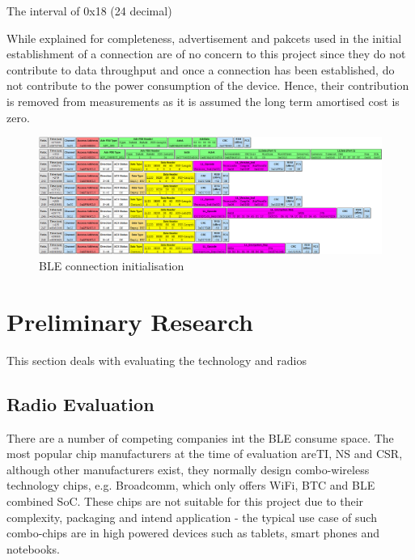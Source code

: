 \documentclass[]{article}
\begin{document}
The interval of 0x18 (24 decimal) 

While explained for completeness, advertisement and pakcets used in the initial establishment of a connection are of no concern to this project since they do not contribute to data throughput and once a connection has been established, do not contribute to the power consumption of the device. Hence, their contribution is removed from measurements as it is assumed the long term amortised cost is zero.

\begin{figure}[htb]
	\begin{center}
		\includegraphics[width = 1.6\textwidth, angle=90]{connection}
	\end{center}
	\caption{\ac{BLE} connection initialisation}
	\label{fig:connection}
\end{figure}

\clearpage

\section{Preliminary Research}

This section deals with evaluating the technology and radios

\subsection{Radio Evaluation}

There are a number of competing companies int the \ac{BLE} consume space. The most popular chip manufacturers at the time of evaluation are\ac{TI}, \ac{NS} and \ac{CSR}, although  other manufacturers exist, they normally design combo-wireless technology chips, e.g. Broadcomm, which only offers WiFi, \ac{BTC} and \ac{BLE} combined \ac{SoC}. These chips are not suitable for this project due to their complexity, packaging and intend application - the typical use case of such combo-chips are in high powered devices such as tablets, smart phones and notebooks. 
\end{document}

